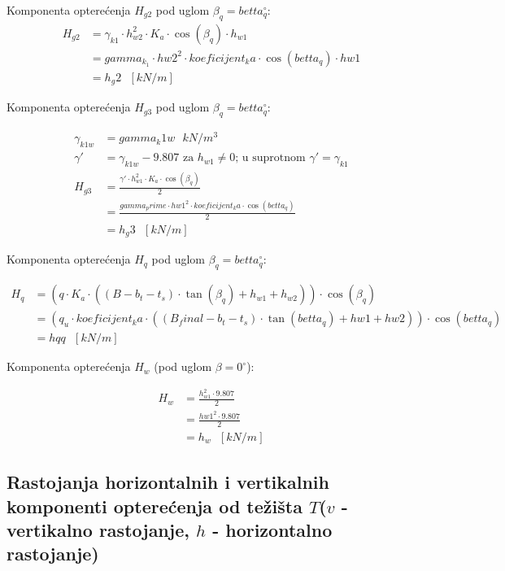 \documentclass[a4paper, 11pt]{article}
\begin{document}
Komponenta optere\'cenja $H_{g2}$ pod uglom $\beta_{q} = betta_q ^ \circ$:
\begin{align*}
H_{g2} &= \gamma_{k1} \cdot h_{w2}^2 \cdot K_{a} \cdot \cos(\beta_{q}) \cdot h_{w1} \\
	   &= gamma_k_1 \cdot hw2^2 \cdot koeficijent_ka \cdot \cos (betta_q) \cdot hw1 \\
	   &= h_g2 \text{ } [kN/m]
\end{align*}

Komponenta optere\'cenja $H_{g3}$ pod uglom $\beta_{q} = betta_q ^ \circ$:

\begin{align*}
\gamma_{k1w} &= gamma_k1w \text{ } kN/m^3 \\
\gamma' &= \gamma_{k1w} - 9.807 \text{ za } h_{w1} \neq 0 \text{; u suprotnom } \gamma' = \gamma_{k1} \\
H_{g3}  &= \frac{\gamma' \cdot h_{w1} ^2 \cdot K_{a} \cdot \cos( \beta_{q})}{2} \\
		&= \frac{gamma_prime \cdot hw1 ^2 \cdot koeficijent_ka \cdot \cos(betta_q)}{2} \\
		&= h_g3 \text{ } [kN/m]
\end{align*}

Komponenta optere\'cenja $H_{q}$ pod uglom $\beta_{q} = betta_q ^ \circ$:

\begin{align*}
H_{q} &=   \left(q \cdot K_{a} \cdot ((B - b_{t} - t_{s}) \cdot \tan (\beta_q) + h_{w1} + h_{w2}) \right) \cdot \cos(\beta_{q})  \\
	  &= \left( q_u \cdot koeficijent_ka \cdot ((B_final - b_t - t_s) \cdot \tan (betta_q) + hw1 + hw2) \right) \cdot \cos(betta_q)  \\
	  &= hqq \text{ } [kN/m]
\end{align*}

Komponenta optere\'cenja $H_{w}$ (pod uglom $\beta=0^\circ$):

\begin{align*}
H_{w} &=  \frac{h_{w1}^2 \cdot 9.807}{2} \\
      &= \frac{hw1^2 \cdot 9.807}{2} \\
      &= h_w \text{ } [kN/m]
\end{align*}

\subsection*{Rastojanja horizontalnih i vertikalnih komponenti optere\'cenja od te\v{z}i\v{s}ta $T$($v$ - vertikalno rastojanje, $h$ - horizontalno rastojanje)}
\end{document}
